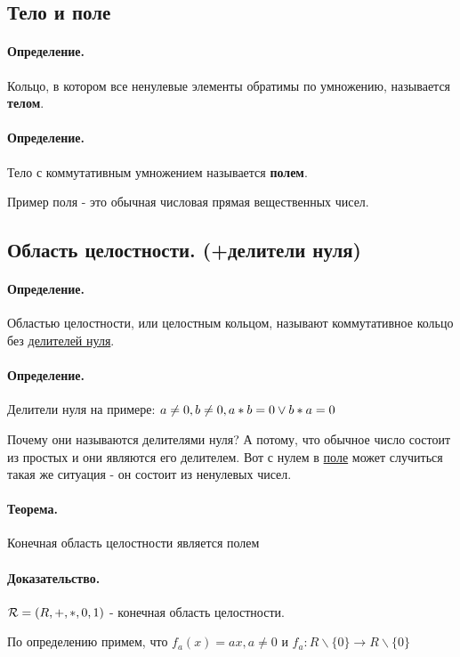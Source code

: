 \documentclass{report}
\begin{document}
\subsection{Тело и поле}
\paragraph*{Определение.}
Кольцо, в котором все ненулевые элементы обратимы по умножению, называется \textbf{телом}.

\paragraph*{Определение.} Тело с коммутативным умножением называется \textbf{полем}.


Пример поля - это обычная числовая прямая вещественных чисел.

\subsection{Область целостности. (+делители нуля)}
\paragraph*{Определение.}
Областью целостности, или целостным кольцом, называют коммутативное кольцо без \underline{делителей нуля}.

\paragraph*{Определение.}
Делители нуля на примере: $a \neq 0, b \neq 0,\newline
	a*b=0 \lor b*a=0$

Почему они называются делителями нуля? А потому, что обычное число состоит
из простых и они являются его делителем. Вот с нулем в \underline{поле}
может случиться такая же ситуация - он состоит из ненулевых чисел.

\paragraph*{Теорема.}
Конечная область целостности является полем
\paragraph*{Доказательство.}
${\cal R} = (R, +, *, 0, 1)$ - конечная область целостности.

По определению примем, что $f_a(x) = ax, a\neq 0 $ и $f_a: R\backslash\{0\} \to R\backslash\{0\}$
\end{document}

